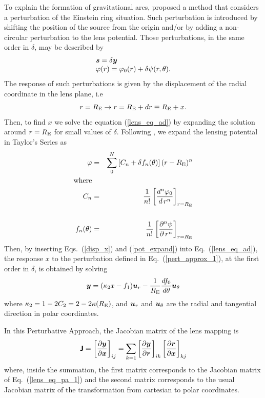 \documentclass[useAMS,usenatbib]{mn2e}
\begin{document}
To explain the formation of gravitational arcs, \citet{allard07} proposed a method that considers a perturbation of the Einstein ring situation. Such perturbation is introduced by shifting the position of the source from the origin and/or by adding a non-circular perturbation to the lens potential. Those perturbations, in the same order in $\delta$, may be described by
\begin{equation}\label{pert_approx_1}
\begin{array}{l}
\bmath{s}=\delta \bmath{y} \\
\varphi(r)=\varphi_0(r)+\delta\psi(r,\theta).
\end{array}
\end{equation}
The response of such perturbations is given by the displacement of the radial coordinate in the lens plane, i.e
\begin{equation}
r=R_{\rm E}\rightarrow  r=R_{\rm E} + dr \equiv R_{\rm E} + x. \label{disp_x}
\end{equation}
Then, to find $x$ we solve the equation (\ref{lens_eq_ad}) by expanding the solution around $r=R_{\rm E}$ for small values of $\delta$. Following \citet{allard07}, we expand the lensing potential in Taylor's Series as
\begin{eqnarray}
\varphi &=&\sum_0^N\left[C_n+\delta f_n(\theta)\right](r-R_{\rm E})^n \label{pot_expand}\\
\textrm{where} & & \nonumber \\
C_n &=&\frac{1}{n!}\left[\frac{d^n\varphi_0}{d\,r^n}\right]_{r=R_{\rm E}} \nonumber \\
 & & \label{fn-cn_def}\\
f_n(\theta)&=&\frac{1}{n!}\left[\frac{\partial^n\psi}{\partial\,r^n}\right]_{r=R_{\rm E}}\nonumber
\end{eqnarray}
Then, by inserting Eqs.~(\ref{disp_x}) and (\ref{pot_expand}) into Eq.~(\ref{lens_eq_ad}), the response $x$ to the perturbation defined in Eq.~(\ref{pert_approx_1}), at the first order in $\delta$, is obtained by solving 
\begin{equation}
\bmath{y}=(\kappa_2 x -f_1)\bmath{u}_r-\frac{1}{R_{\rm E}}\frac{d f_0}{d \theta}\bmath{u}_{\theta} \label{lens_eq_pa_1}
\end{equation}
where $\kappa_2=1-2C_2=2-2\kappa(R_{\rm E})$, and $\bmath{u}_{r}$ and $\bmath{u}_{\theta}$ are the radial and tangential direction in polar coordinates.

In this Perturbative Approach, the Jacobian matrix of the lens mapping is
\begin{equation}
\mathbfss{J} = \left[\frac{\partial \bmath{y}}{\partial \bmath{x}}\right]_{ij}=\sum_{k=1}\left[\frac{\partial \bmath{y}}{\partial \bmath{r}}\right]_{ik}\left[\frac{\partial \bmath{r}}{\partial \bmath{x}}\right]_{kj} \label{jacob_matrix_pa}
\end{equation}
where, inside the summation, the first matrix corresponds to the Jacobian matrix of Eq.~(\ref{lens_eq_pa_1}) and the second matrix corresponds to the usual Jacobian matrix of the transformation from cartesian to polar coordinates.  
\end{document}
